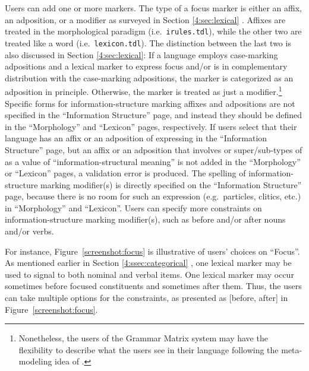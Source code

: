 \newpage 
Users can add one or more  markers. The type
of a focus marker is either an affix, an adposition, or a modifier as
surveyed in Section \ref{4:sec:lexical}
. Affixes are treated in the morphological
paradigm (i.e.\ \texttt{irules.tdl}), while the other two are treated
like a word (i.e.\ \texttt{lexicon.tdl}). The distinction between the
last two is also discussed in Section \ref{4:sec:lexical}:
If a language employs case-marking adpositions and a lexical marker to
express focus and/or  is in complementary distribution with
the case-marking adpositions, the marker is categorized as an
adposition in principle. Otherwise, the marker is treated as just a
modifier.\footnote{Nonetheless, the users of the \lingo Grammar Matrix
  system may have the flexibility to describe what the users see in
  their language following the meta-modeling idea of \citet{poulson:11}.}
Specific forms for information-structure marking affixes and
adpositions are not specified in the ``Information Structure'' page,
and instead they should be defined in the ``Morphology'' and
``Lexicon'' pages, respectively. If users select that their language
has an affix or an adposition of expressing  in the
``Information Structure'' page, but an affix or an adposition that
involves  or super/sub-types of  as a value of
``information-structural meaning'' is not added in the ``Morphology''
or ``Lexicon'' pages, a validation error is produced. The spelling of
information-structure marking modifier(s) is directly specified on the
``Information Structure'' page, because there is no room for such an
expression (e.g.\ particles, clitics, etc.) in ``Morphology'' and
``Lexicon''.  Users can specify more constraints on
information-structure marking modifier(s), such as before and/or after
nouns and/or verbs.





For instance, Figure~\ref{screenshot:focus} is illustrative of users'
choices on ``Focus''. As mentioned earlier in
Section \ref{4:ssec:categorical} , one lexical
marker may be used to signal  to both nominal and verbal
items. One lexical marker may occur sometimes before focused
constituents and sometimes after them. Thus, the users can take
multiple options for the constraints, as presented as [before, after]
in Figure~\ref{screenshot:focus}.



